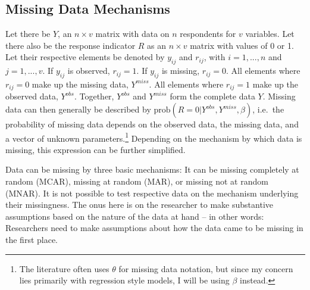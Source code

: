 \documentclass[12pt,econ]{sources/authesis}
\begin{document}
\hypertarget{ordmiss-theory-mechanisms}{%
\subsection{Missing Data Mechanisms}\label{ordmiss-theory-mechanisms}}

Let there be \(Y\), an \(n \times v\) matrix with data on \(n\) respondents for \(v\) variables. Let there also be the response indicator \(R\) as an \(n \times v\) matrix with values of 0 or 1. Let their respective elements be denoted by \(y_{ij}\) and \(r_{ij}\), with \(i = 1, ..., n\) and \(j = 1, ..., v\). If \(y_{ij}\) is observed, \(r_{ij} = 1\). If \(y_{ij}\) is missing, \(r_{ij} = 0\). All elements where \(r_{ij} = 0\) make up the missing data, \(Y^{miss}\). All elements where \(r_{ij} = 1\) make up the observed data, \(Y^{obs}\). Together, \(Y^{obs}\) and \(Y^{miss}\) form the complete data \(Y\). Missing data can then generally be described by \(\text{prob}(R = 0 | Y^{obs}, Y^{miss}, \beta)\), i.e.~the probability of missing data depends on the observed data, the missing data, and a vector of unknown parameters.\footnote{The literature often uses \(\theta\) for missing data notation, but since my concern lies primarily with regression style models, I will be using \(\beta\) instead.} Depending on the mechanism by which data is missing, this expression can be further simplified.

Data can be missing by three basic mechanisms: It can be missing completely at random (MCAR), missing at random (MAR), or missing not at random (MNAR). It is not possible to test respective data on the mechanism underlying their missingness. The onus here is on the researcher to make substantive assumptions based on the nature of the data at hand -- in other words: Researchers need to make assumptions about how the data came to be missing in the first place.
\end{document}

